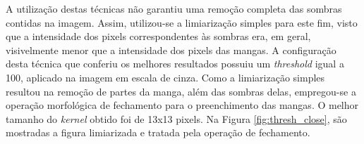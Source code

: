 \begin{figure}[H]
\end{figure}

A utilização destas técnicas não garantiu uma remoção completa das sombras contidas na imagem. Assim, utilizou-se a limiarização simples para este fim, visto que a intensidade dos pixels correspondentes às sombras era, em geral, visivelmente menor que a intensidade dos pixels das mangas. A configuração desta técnica que conferiu os melhores resultados possuiu um \textit{threshold} igual a 100, aplicado na imagem em escala de cinza. Como a limiarização simples resultou na remoção de partes da manga, além das sombras delas, empregou-se a operação morfológica de fechamento para o preenchimento das mangas. O melhor tamanho do \textit{kernel} obtido foi de 13x13 pixels. Na Figura \ref{fig:thresh_close}, são mostradas a figura limiarizada e tratada pela operação de fechamento.

